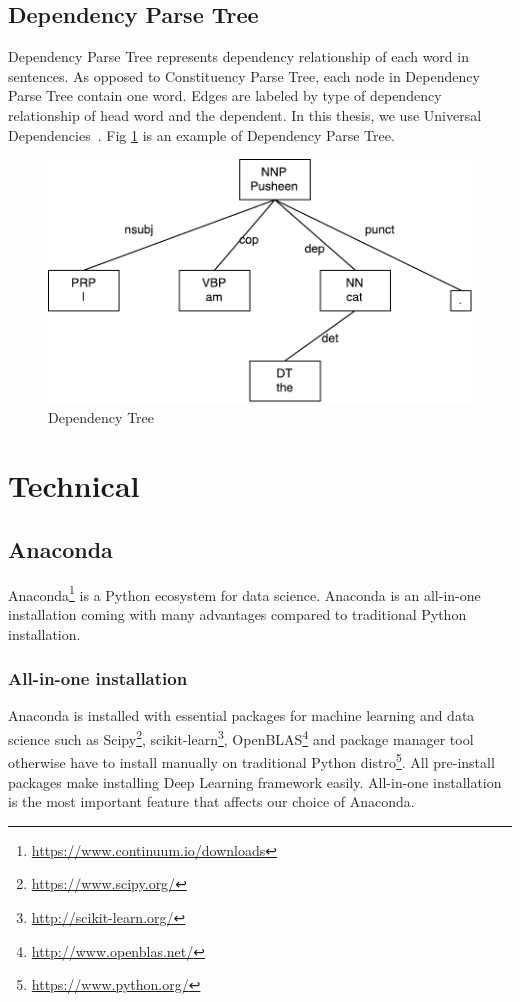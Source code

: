 \subsection{Dependency Parse Tree}
Dependency Parse Tree represents dependency relationship of each word in sentences.
As opposed to Constituency Parse Tree, each node in Dependency Parse Tree contain one word.
Edges are labeled by type of dependency relationship of head word and the dependent. In this thesis, we use Universal Dependencies~\cite{nivre2016universal}. Fig \ref{fig:udexample} is an example of Dependency Parse Tree.

\begin{figure}[H]
    \centering
    \includegraphics[width=0.7\linewidth]{figure/udexample}
    \caption[Dependency Tree]{Dependency Tree}
    \label{fig:udexample}
\end{figure}


\section{Technical}
\subsection{Anaconda}
Anaconda\footnote{\url{https://www.continuum.io/downloads}} is a Python ecosystem for data science. Anaconda is an all-in-one installation coming with many advantages compared to traditional Python installation.

\subsubsection{All-in-one installation}
Anaconda is installed with essential packages for machine learning and data science such as Scipy\footnote{\url{https://www.scipy.org/}}, scikit-learn\footnote{\url{http://scikit-learn.org/}}, OpenBLAS\footnote{\url{http://www.openblas.net/}} and package manager tool otherwise have to install manually on traditional Python distro\footnote{\url{https://www.python.org/}}. All pre-install packages make installing Deep Learning framework easily. All-in-one installation is the most important feature that affects our choice of Anaconda.

